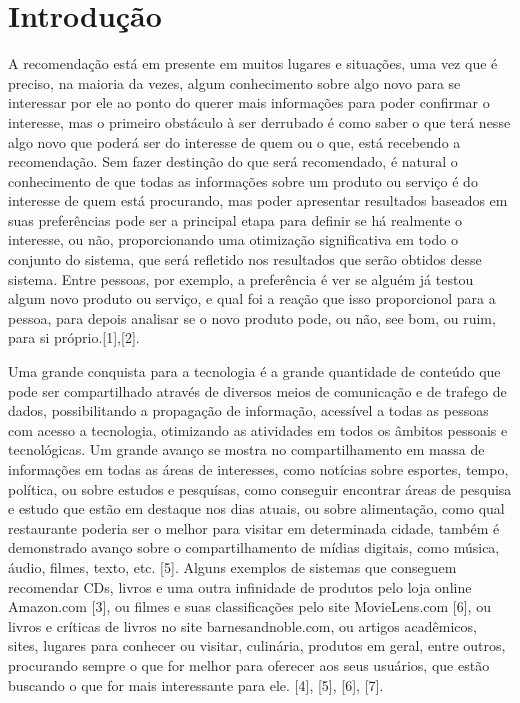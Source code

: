\documentclass[12pt,
				openright,
				twoside,
				a4paper,
				apter=TITLE,
				section=TITLE,
				subsection=TITLE,
				chapter=TITLE,
				english,
				brazil]{abntex2}
\begin{document}
\chapter{Introdução}
A recomendação está em presente em muitos lugares e situações, uma vez que é preciso, na maioria da vezes, algum conhecimento sobre algo novo para se interessar por ele ao ponto do querer mais informações para poder confirmar o interesse, mas o primeiro obstáculo à ser derrubado é como saber o que terá nesse algo novo que poderá ser do interesse de quem ou o que, está recebendo a recomendação. Sem fazer destinção do que será recomendado, é natural o conhecimento de que todas as informações sobre um produto ou serviço é do interesse de quem está procurando, mas poder apresentar resultados baseados em suas preferências pode ser a principal etapa para definir se há realmente o interesse, ou não, proporcionando uma otimização significativa em todo o conjunto do sistema, que será refletido nos resultados que serão obtidos desse sistema. Entre pessoas, por exemplo, a preferência é ver se alguém já testou algum novo produto ou serviço, e qual foi a reação que isso proporcionol para a pessoa, para depois analisar se o novo produto pode, ou não, see bom, ou ruim, para si próprio.[1],[2].

Uma grande conquista para a tecnologia é a grande quantidade de conteúdo que pode ser compartilhado através de diversos meios de comunicação e de trafego de dados, possibilitando a propagação de informação, acessível a todas as pessoas com acesso a tecnologia, otimizando as atividades em todos os âmbitos pessoais e tecnológicas. Um grande avanço se mostra no compartilhamento em massa de informações em todas as áreas de interesses, como notícias sobre esportes, tempo, política, ou sobre estudos e pesquísas, como conseguir encontrar áreas de pesquisa e estudo que estão em destaque nos dias atuais, ou sobre alimentação, como qual restaurante poderia ser o melhor para visitar em determinada cidade, também é demonstrado avanço sobre o compartilhamento de mídias digitais, como música, áudio, filmes, texto, etc. [5]. Alguns exemplos de sistemas que conseguem recomendar CDs, livros e uma outra infinidade de produtos pelo loja online Amazon.com [3], ou filmes e suas classificações pelo site MovieLens.com [6], ou livros e críticas de livros no site barnesandnoble.com, ou artigos acadêmicos, sites, lugares para conhecer ou visitar, culinária, produtos em geral, entre outros, procurando sempre o que for melhor para oferecer aos seus usuários, que estão buscando o que for mais interessante para ele. [4], [5], [6], [7].
\end{document}
